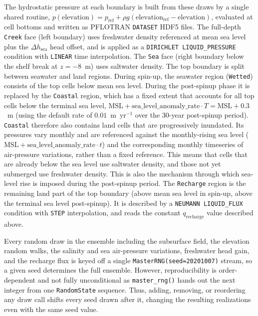 The hydrostatic pressure at each boundary is built from these draws by a single
shared routine, $p(\mathrm{elevation}) = p_{\mathrm{ref}} + \rho g
(\mathrm{elevation}_{\mathrm{ref}} - \mathrm{elevation})$, evaluated at cell
bottoms and written as PFLOTRAN \texttt{DATASET} HDF5 files. The full-depth
\texttt{Creek} face (left boundary) uses freshwater density referenced at
mean sea level plus the $\Delta h_{\mathrm{sea}}$ head offset, and is applied
as a \texttt{DIRICHLET LIQUID\_PRESSURE} condition with \texttt{LINEAR} time
interpolation. The \texttt{Sea} face (right boundary below the shelf break at $z=-8$~m) uses saltwater density. The top boundary is split between seawater and land regions. During spin-up, the seawater region (\texttt{Wetted}) consists of the top cells below mean sea level. During the post-spinup phase it is replaced by the \texttt{Coastal} region, which has a fixed extent that accounts for all top cells below the terminal sea level, $\mathrm{MSL} + \mathrm{sea\_level\_anomaly\_rate}\cdot T = \mathrm{MSL} + 0.3$~m (using the default rate of $0.01$~m~yr$^{-1}$ over the 30-year post-spinup period). \texttt{Coastal} therefore also contains land cells that are progressively inundated. Its pressures vary monthly and are referenced against the monthly-rising sea level ($\mathrm{MSL} + \mathrm{sea\_level\_anomaly\_rate}\cdot t$) and the corresponding monthly timeseries of air-pressure variations, rather than a fixed reference. This means that cells that are already below the sea level use saltwater density, and those not yet submerged use freshwater density. This is also the mechanism through which sea-level rise is imposed during the post-spinup period. The \texttt{Recharge} region is the remaining land part of the top boundary (above mean sea level in spin-up, above the terminal sea level post-spinup). It is described by a \texttt{NEUMANN LIQUID\_FLUX} condition with \texttt{STEP} interpolation, and reads the constant $q_{\mathrm{recharge}}$ value described above.

Every random draw in the ensemble including the subsurface field, the elevation
random walks, the salinity and sea air-pressure variations, freshwater head gain, and the recharge flux is keyed off a single \texttt{MasterRNG(seed=20201007)} stream, so a given seed determines the full ensemble. However, reproducibility is order-dependent and not fully unconditional as \texttt{master\_rng()} hands out the next integer from one \texttt{RandomState} sequence. Thus, adding, removing, or reordering any draw call shifts every seed drawn after it, changing the resulting realizations even with the same seed value.


